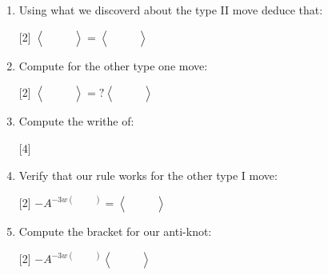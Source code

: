 \documentclass[14pt]{extarticle}
\newcommand{\LP}{\left(}
\newcommand{\RP}{\right)}
\newcommand{\LA}{\left\langle}
\newcommand{\RA}{\right\rangle}
\newcommand{\img}[1]{\begin{aligned}
    &\quad\\
    &\\
    &\quad
\end{aligned}}
\newcommand{\bkt}[1]{\LA\img{#1}\RA}
\begin{document}
\fancyhead{}
\begin{enumerate}
\item{
Using what we discoverd about the type II move deduce that:
\vspace{-2cm}
\begin{center}
\scalebox{2}[2]{
$\bkt{1.svg}=\bkt{6.svg}$
}
\end{center}
}
\vspace{5cm}

\item{
Compute for the other type one move:
\vspace{-2cm}
\begin{center}
\scalebox{2}[2]{
    ${\LA\img{t1.svg}\RA=?\LA\img{t1_2.svg}\RA}$
    }
\end{center}
}
\newpage


\item{
Compute the writhe of:
\vspace{-2cm}
\begin{center}
    \scalebox{4}[4]{
        $\img{trefoil.svg}$
        }
\end{center}}

\vspace{2cm}
\item{
Verify that our rule works for the other type I move:
\vspace{-6cm}
\begin{center}
    \scalebox{2}[2]{
        $-A^{-3w\LP \img{t1.svg}\RP}=\LA\img{t1_2.svg}\RA$
        }
\end{center}}
\newpage
\item{
Compute the bracket for our anti-knot:
\vspace{-2cm}
\begin{center}
    \scalebox{2}[2]{
        $-A^{-3w\LP \img{right.svg}\RP}\LA\img{right.svg}\RA$
        }
\end{center}}


\end{enumerate}
\end{document}
